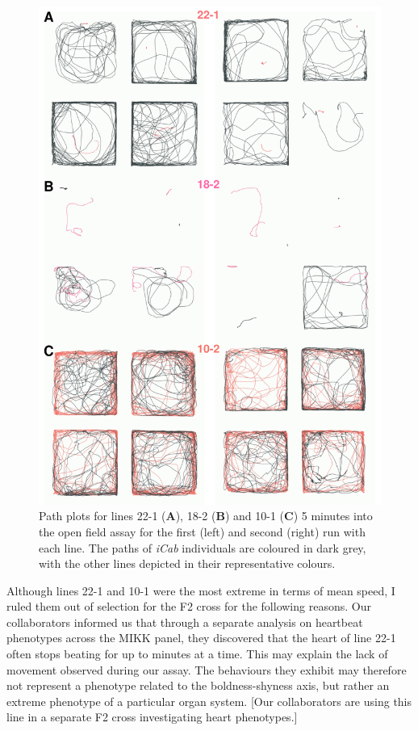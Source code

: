 \documentclass[
]{book}
\begin{document}
\begin{figure}
\includegraphics[width=1\linewidth]{figs/mikk_behaviour/path_plot_22-1_18-2_10-1_300} \caption{Path plots for lines 22-1 (\textbf{A}), 18-2 (\textbf{B}) and 10-1 (\textbf{C}) 5 minutes into the open field assay for the first (left) and second (right) run with each line. The paths of \emph{\textcolor{iCab_424B4D}{iCab}} individuals are coloured in dark grey, with the other lines depicted in their representative colours.}\label{fig:extreme-paths}
\end{figure}

Although lines \textcolor{22-1_FB737A}{22-1} and \textcolor{10-1_F8766D}{10-1} were the most extreme in terms of mean speed, I ruled them out of selection for the F2 cross for the following reasons. Our collaborators informed us that through a separate analysis on heartbeat phenotypes across the MIKK panel, they discovered that the heart of line \textcolor{22-1_FB737A}{22-1} often stops beating for up to minutes at a time. This may explain the lack of movement observed during our assay. The behaviours they exhibit may therefore not represent a phenotype related to the boldness-shyness axis, but rather an extreme phenotype of a particular organ system. {[}Our collaborators are using this line in a separate F2 cross investigating heart phenotypes.{]}
\end{document}
